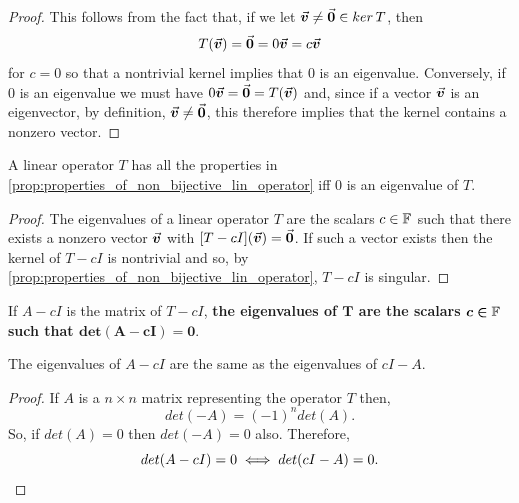 \documentclass[MathsNotesBase.tex]{subfiles}
\begin{document}
{		\medskip
		\begin{proof}
			This follows from the fact that, if we let ${ \vec{\bm{v}} \neq \vec{\bm{0}} \in ker\,T }$, then
			\[ T(\vec{\bm{v}}) = \vec{\bm{0}} = 0\vec{\bm{v}} = c\vec{\bm{v}} \]
			for ${ c = 0 }$ so that a nontrivial kernel implies that 0 is an eigenvalue. Conversely, if 0 is an eigenvalue we must have ${ 0\vec{\bm{v}} = \vec{\bm{0}} = T(\vec{\bm{v}}) }$ and, since if a vector $\vec{\bm{v}}$ is an eigenvector, by definition, ${ \vec{\bm{v}} \neq \vec{\bm{0}} }$, this therefore implies that the kernel contains a nonzero vector.
		\end{proof}
		\begin{corollary}
			A linear operator $T$ has all the properties in \autoref{prop:properties_of_non_bijective_lin_operator} iff 0 is an eigenvalue of $T$.
		\end{corollary}
	
		\medskip
		\begin{proof}
			The eigenvalues of a linear operator $T$ are the scalars ${ c \in \mathbb{F}^{} }$ such that there exists a nonzero vector $\vec{\bm{v}}$ with ${ [T - cI](\vec{\bm{v}}) = \vec{\bm{0}} }$. If such a vector exists then the kernel of ${ T - cI }$ is nontrivial and so, by \autoref{prop:properties_of_non_bijective_lin_operator}, ${ T - cI }$ is singular.
		\end{proof}
		\begin{corollary}
			If ${ A - cI }$ is the matrix of ${ T - cI }$, \textbf{the eigenvalues of $\bm{T}$ are the scalars ${\bm{ c \in \mathbb{F}^{} }}$ such that ${\bm{ det(A - cI) = 0 }}$}.
		\end{corollary}
		\begin{corollary}
			The eigenvalues of ${ A - cI }$ are the same as the eigenvalues of ${ cI - A }$.
		\end{corollary}
		\begin{proof}
			If $A$ is a ${ n \times n }$ matrix representing the operator $T$ then,
			\[ det(-A) = (-1)^n det(A). \]
			So, if ${ det(A) = 0 }$ then ${ det(-A) = 0 }$ also. Therefore,
			\[ det(A - cI) = 0 \iff det(cI - A) = 0. \qedhere \]
		\end{proof}
	
		\bigskip
}
\end{document}
